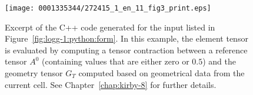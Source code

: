 \begin{figure}[!p]
\vspace*{-1pc}
\bwfig
\narrowfigure
\texttt{[image: 0001335344/272415\_1\_en\_11\_fig3\_print.eps]}
  \caption{Excerpt of the C++ code generated for the input listed in
  Figure~\ref{fig:logg-1:python:form}. In this example, the element tensor is
  evaluated by computing a tensor contraction between a reference
  tensor $A^0$ (containing values that are either zero or $0.5$) and
  the geometry tensor $G_T$ computed based on geometrical data from
  the current cell. See Chapter~\ref{chap:kirby-8} for further details.}
  \label{fig:logg-1:formcode}
\end{figure}

\makeatletter
\def\img@cmode{\hskip-5pt\begin{turn}{90}\rlap{\kern1.5\p@\@img@cmode{\@cmodetext}}\end{turn}}
\makeatother


